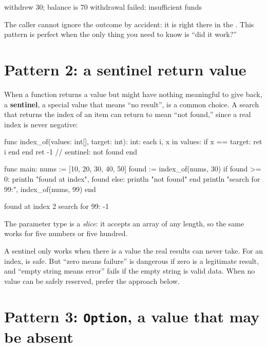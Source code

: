 \begin{progout}
withdrew 30; balance is 70
withdrawal failed: insufficient funds
\end{progout}

The caller cannot ignore the outcome by accident: it is right there in the
. This pattern is perfect when the only thing you need to know is
``did it work?''

\section{Pattern 2: a sentinel return value}

When a function returns a value but might have nothing meaningful to give back, a
\textbf{sentinel}, a special value that means ``no result'', is a common
choice. A search that returns the index of an item can return  to mean
``not found,'' since a real index is never negative:

\begin{salamen}
func index_of(values: int[], target: int): int:
    each i, x in values:
        if x == target:
            ret i
        end
    end
    ret -1                         // sentinel: not found
end

func main:
    nums := [10, 20, 30, 40, 50]
    found := index_of(nums, 30)
    if found >= 0:
        println "found at index", found
    else:
        println "not found"
    end
    println "search for 99:", index_of(nums, 99)
end
\end{salamen}

\begin{progout}
found at index 2
search for 99: -1
\end{progout}

The parameter type  is a \emph{slice}: it accepts an 
array of any length, so the same  works for five numbers or five
hundred.

\begin{warn}
A sentinel only works when there is a value the real results can never take. For
an index,  is safe. But ``zero means failure'' is dangerous if zero is a
legitimate result, and ``empty string means error'' fails if the empty string is
valid data. When no value can be safely reserved, prefer the 
approach below.
\end{warn}

\section{Pattern 3: \texttt{Option}, a value that may be absent}

